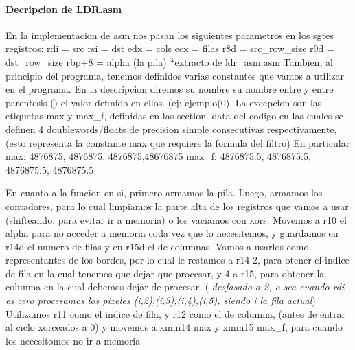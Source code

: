 \documentclass[a4paper]{article}
\begin{document}
	
\paragraph{\textbf{Decripcion de LDR.asm}}
\hfill \break	 	
	En la implementacion de asm nos pasan los siguientes parametros en los sgtes registros:
	\hfill \break
   rdi = src
   \hfill \break
   rsi = dst
   \hfill \break
   edx = cols
   \hfill \break
   ecx = filas
   \hfill \break
   r8d = src_row_size
   \hfill \break
   r9d = dst_row_size
   \hfill \break
   rbp+8 = alpha (la pila)
   \hfill \break
*extracto de ldr_asm.asm
\hfill \break
	Tambien, al principio del programa, tenemos definidos varias constantes que vamos a utilizar en el programa. En la descripcion diremos su nombre su nombre entre {} y entre parentesis () el valor definido en ellos. (ej: {ejemplo(0)}.
	\hfill \break
	 La excepcion son las etiquetas max y max_f, definidas en las section. data del codigo en las cuales se definen 4 doublewords/floats de precision simple consecutivas respectivamente, (esto representa la constante max que requiere la formula del filtro)
	En particular 
	\hfill \break
	max: 4876875, 4876875, 4876875,48676875
	\hfill \break
	max_f: 4876875.5, 4876875.5, 4876875.5, 4876875.5
	\hfill \break
	
	En cuanto a la funcion en si, primero armamos la pila. Luego, armamos los contadores, para lo cual  limpiamos la parte alta de los registros que vamos a usar (shifteando, para evitar ir a memoria) o los vaciamos con xors. Movemos a r10 el alpha para no acceder a memoria coda vez que lo necesitemos, y guardamos en r14d el numero de filas y en r15d el de columnas. Vamos a usarlos como representantes de los bordes, por lo cual le restamos a r14 2, para otener el indice de fila en la cual tenemos que dejar que procesar, y 4 a r15, para obtener la columna en la cual debemos dejar de procesar. 	
	(\textit{ desfasado a 2, o sea cuando rdi es cero procesamos los pixeles {(i,2),(i,3),(i,4),(i,5)}, siendo i la fila actual})
	\hfill \break 
	Utilizamos r11 como el indice de fila, y r12 como el de columna, (antes de entrar al ciclo xorceados a 0)  y movemos a xmm14 max y xmm15 max_f, para cuando los necesitomos no ir  a memoria
	\hfill \break
	\\
	
\end{document}
